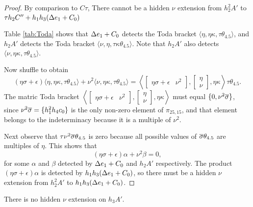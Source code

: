 \begin{proof}
By comparison to $C\tau$, 
There cannot be a hidden $\nu$ extension from
$h_2^2 A'$ to $\tau h_2 C'' + h_1 h_3 (\Delta e_1 + C_0)$


Table \ref{tab:Toda} shows that
$\Delta e_1 + C_0$ detects the Toda bracket
$\langle \eta, \eta \kappa, \tau \theta_{4.5} \rangle$,
and $h_2 A'$ detects the Toda bracket
$\langle \nu, \eta, \tau \kappa \theta_{4.5} \rangle$.
Note that $h_2 A'$ also detects
$\langle \nu, \eta \kappa, \tau \theta_{4.5} \rangle$.

Now shuffle to obtain
\[
(\eta \sigma + \epsilon) \langle \eta, \eta \kappa, 
\tau \theta_{4.5} \rangle +
\nu^2 \langle \nu, \eta \kappa, \tau \theta_{4.5} \rangle =
\left\langle
\left[
\begin{array}{cc}
\eta \sigma + \epsilon & \nu^2
\end{array}
\right],
\left[
\begin{array}{c}
\eta \\
\nu 
\end{array}
\right],
\eta \kappa \right\rangle \tau \theta_{4.5}.
\]
The matric Toda bracket
$\displaystyle
\left\langle
\left[
\begin{array}{cc}
\eta \sigma + \epsilon & \nu^2
\end{array}
\right],
\left[
\begin{array}{c}
\eta \\
\nu 
\end{array}
\right],
\eta \kappa \right\rangle$
must equal $\{ 0, \nu^2 \overline{\sigma} \}$,
since $\nu^2 \overline{\sigma} = \{ h_1^2 h_4 c_0 \}$
is the only non-zero element of $\pi_{25,15}$,
and that element belongs to the indeterminacy because it is a
multiple of $\nu^2$.

Next observe that $\tau \nu^2 \overline{\sigma} \theta_{4.5}$ is zero
because all possible values of
$\overline{\sigma} \theta_{4.5}$ are multiples of $\eta$.
This shows that
\[
(\eta \sigma + \epsilon) \alpha + \nu^2 \beta = 0,
\]
for some $\alpha$ and $\beta$ detected by $\Delta e_1 + C_0$
and $h_2 A'$ respectively.
The product
$(\eta \sigma + \epsilon) \alpha$ is detected by
$h_1 h_3 (\Delta e_1 + C_0)$, so there must be a hidden $\nu$
extension from $h_2^2 A'$ to $h_1 h_3 (\Delta e_1 + C_0)$.
\end{proof}

\begin{lemma}
\label{lem:nu-h3A'}
There is no hidden $\nu$ extension on $h_3 A'$.
\end{lemma}

